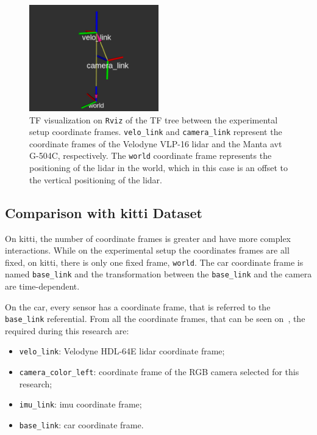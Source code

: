 \begin{figure}[!ht]
	\centering
	\includegraphics[width=0.5\textwidth]{img/calibration/extrinsic-calibration-frames.png}
	\caption[Experimental setup TF tree coordinate frames.]{TF visualization on \texttt{Rviz} of the TF tree between the experimental setup coordinate frames. \texttt{velo\_link} and \texttt{camera\_link} represent the coordinate frames of the Velodyne VLP-16 \ac{lidar} and the Manta \ac{avt} G-504C, respectively. The \texttt{world} coordinate frame represents the positioning of the \ac{lidar} in the world, which in this case is an offset to the vertical positioning of the \ac{lidar}.}
	\label{fig:extrinsic-calibration-frames}
\end{figure}

\subsection{Comparison with \acs{kitti} Dataset}
\label{subsec:calibration:kitti-comparison}

On \ac{kitti}, the number of coordinate frames is greater and have more complex interactions. While on the experimental setup the coordinates frames are all fixed, on \ac{kitti}, there is only one fixed frame, \texttt{world}. The car coordinate frame is named \texttt{base\_link} and the transformation between the \texttt{base\_link} and the camera are time-dependent.

On the car, every sensor has a coordinate frame, that is referred to the \texttt{base\_link} referential. From all the coordinate frames, that can be seen on~\cite{Geiger2013a}, the required during this research are:

\begin{itemize}
	\item \texttt{velo\_link}: Velodyne HDL-64E \ac{lidar} coordinate frame;
	\item \texttt{camera\_color\_left}: coordinate frame of the RGB camera selected for this research;
	\item \texttt{imu\_link}: \ac{imu} coordinate frame;
	\item \texttt{base\_link}: car coordinate frame.
\end{itemize}

